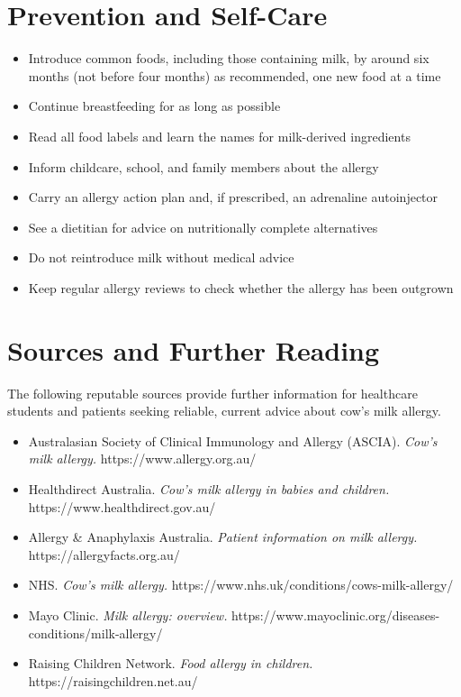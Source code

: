 \section*{Prevention and Self-Care}
\begin{itemize}
    \item Introduce common foods, including those containing milk, by around six months (not before four months) as recommended, one new food at a time
    \item Continue breastfeeding for as long as possible
    \item Read all food labels and learn the names for milk-derived ingredients
    \item Inform childcare, school, and family members about the allergy
    \item Carry an allergy action plan and, if prescribed, an adrenaline autoinjector
    \item See a dietitian for advice on nutritionally complete alternatives
    \item Do not reintroduce milk without medical advice
    \item Keep regular allergy reviews to check whether the allergy has been outgrown
\end{itemize}

\section*{Sources and Further Reading}
The following reputable sources provide further information for healthcare students and patients seeking reliable, current advice about cow's milk allergy.

\begin{itemize}
    \item Australasian Society of Clinical Immunology and Allergy (ASCIA). \textit{Cow's milk allergy.} https://www.allergy.org.au/
    \item Healthdirect Australia. \textit{Cow's milk allergy in babies and children.} https://www.healthdirect.gov.au/
    \item Allergy \& Anaphylaxis Australia. \textit{Patient information on milk allergy.} https://allergyfacts.org.au/
    \item NHS. \textit{Cow's milk allergy.} https://www.nhs.uk/conditions/cows-milk-allergy/
    \item Mayo Clinic. \textit{Milk allergy: overview.} https://www.mayoclinic.org/diseases-conditions/milk-allergy/
    \item Raising Children Network. \textit{Food allergy in children.} https://raisingchildren.net.au/
\end{itemize}
